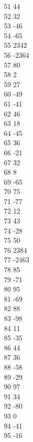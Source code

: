 { 51	44 \\
 52	32 \\
 53	-46 \\
 54	-65 \\
 55	2342 \\
 56	-2364 \\
 57	80 \\
 58	2 \\
 59	27 \\
 60	-49 \\
 61	-41 \\
 62	46 \\
 63	18 \\
 64	-45 \\
 65	36 \\
 66	-21 \\
 67	32 \\
 68	8 \\
 69	-65 \\
 70	75 \\
 71	-77 \\
 72	12 \\
 73	43 \\
 74	-28 \\
 75	50 \\
 76	2384 \\
 77	-2463 \\
 78	85 \\
 79	-71 \\
 80	95 \\
 81	-69 \\
 82	88 \\
 83	-98 \\
 84	11 \\
 85	-35 \\
 86	44 \\
 87	36 \\
 88	-58 \\
 89	-29 \\
 90	97 \\
 91	34 \\
 92	-80 \\
 93	0 \\
 94	-41 \\
 95	-16 \\
}
